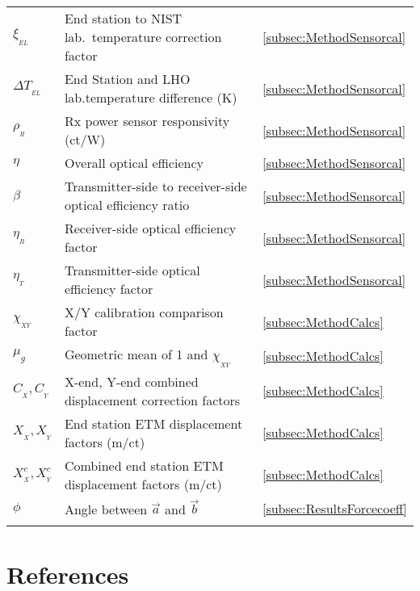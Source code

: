\documentclass[12pt,a4paper,final]{iopart}
\begin{document}
\begin{table}[h]
\begin{indented}
\begin{tabular}{L{1.3cm} L{8.8cm} C{1.2cm}}
        $\xi_{_{EL}}$ & End station to NIST lab.\ temperature correction factor  & \ref{subsec:MethodSensorcal} \\
        $\Delta T_{_{EL}}$ & End Station and LHO lab.temperature difference (K) & \ref{subsec:MethodSensorcal} \\
        $\rho_{_R}$ & Rx power sensor responsivity (ct/W) & \ref{subsec:MethodSensorcal} \\
        $\eta$ & Overall optical efficiency & \ref{subsec:MethodSensorcal} \\
        $\beta$ & Transmitter-side to receiver-side optical efficiency ratio & \ref{subsec:MethodSensorcal} \\
        $\eta_{_R}$ & Receiver-side optical efficiency factor &  \ref{subsec:MethodSensorcal} \\
        $\eta_{_T}$ & Transmitter-side optical efficiency factor &  \ref{subsec:MethodSensorcal} \\
        $\chi_{_{XY}}$ &  X/Y calibration comparison factor & \ref{subsec:MethodCalcs} \\
        $\mu_{g}$ & Geometric mean of 1 and $\chi_{_{XY}}$ & \ref{subsec:MethodCalcs} \\
        $C_{_X}, C_{_Y}$ & X-end, Y-end combined  displacement  correction  factors & \ref{subsec:MethodCalcs} \\
        $X_{_{X}}, X_{_{Y}} $ & End station ETM displacement factors (m/ct)& \ref{subsec:MethodCalcs} \\
        $X^c_{_X}, X^c_{_Y}$ & Combined end station ETM displacement factors (m/ct)& \ref{subsec:MethodCalcs} \\
        $\phi$ & Angle between $\vec{a}$ and $\vec{b}$ &  \ref{subsec:ResultsForcecoeff}\\
        \Xhline{4\arrayrulewidth}
    \end{tabular}
\label{tab:allParams}
\end{indented}        
\end{table}

\section*{References}


\end{document}
